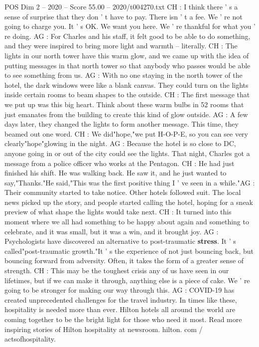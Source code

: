 \begin{textsample}{POS Dim 2 – 2020 – Score 55.00 – 2020/t004270.txt}
CH : I think there ' s a sense of surprise that they don ' t have to pay.
There isn ' t a fee.
We ' re not going to charge you.
It ' s OK.
We want you here.
We ' re thankful for what you ' re doing.
AG : For Charles and his staff, it felt good to be able to do something, and they were inspired to bring more light and warmth -- literally.
CH : The lights in our north tower have this warm glow, and we came up with the idea of putting messages in that north tower so that anybody who passes would be able to see something from us.
AG : With no one staying in the north tower of the hotel, the dark windows were like a blank canvas.
They could turn on the lights inside certain rooms to beam shapes to the outside.
CH : The first message that we put up was this big heart.
Think about these warm bulbs in 52 rooms that just emanates from the building to create this kind of glow outside.
AG : A few days later, they changed the lights to form another message.
This time, they beamed out one word.
CH : We did"hope,"we put H-O-P-E, so you can see very clearly"hope"glowing in the night.
AG : Because the hotel is so close to DC, anyone going in or out of the city could see the lights.
That night, Charles got a message from a police officer who works at the Pentagon.
CH : He had just finished his shift.
He was walking back.
He saw it, and he just wanted to say,"Thanks."He said,"This was the first positive thing I ' ve seen in a while."AG : Their community started to take notice.
Other hotels followed suit.
The local news picked up the story, and people started calling the hotel, hoping for a sneak preview of what shape the lights would take next.
CH : It turned into this moment where we all had something to be happy about again and something to celebrate, and it was small, but it was a win, and it brought joy.
AG : Psychologists have discovered an alternative to post-traumatic \textbf{stress}.
It ' s called"post-traumatic growth."It ' s the experience of not just bouncing back, but bouncing forward from adversity.
Often, it takes the form of a greater sense of strength.
CH : This may be the toughest crisis any of us have seen in our lifetimes, but if we can make it through, anything else is a piece of cake.
We ' re going to be stronger for making our way through this.
AG : COVID-19 has created unprecedented challenges for the travel industry.
In times like these, hospitality is needed more than ever.
Hilton hotels all around the world are coming together to be the bright light for those who need it most.
Read more inspiring stories of Hilton hospitality at newsroom. hilton. com / actsofhospitality.

\end{textsample}
